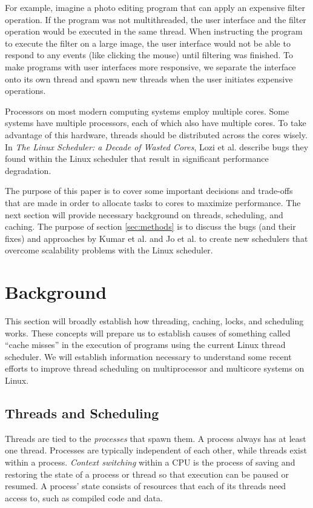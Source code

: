 \documentclass{sig-alternate}
\begin{document}
For example, imagine a photo editing program that can apply an expensive filter operation. If the program was not multithreaded, the user interface and the filter operation would be executed in the same thread. When instructing the program to execute the filter on a large image, the user interface would not be able to respond to any events (like clicking the mouse) until filtering was finished. To make programs with user interfaces more responsive, we separate the interface onto its own thread and spawn new threads when the user initiates expensive operations.

Processors on most modern computing systems employ multiple cores. Some systems have multiple processors, each of which also have multiple cores. To take advantage of this hardware, threads should be distributed across the cores wisely. In \emph{The Linux Scheduler: a Decade of Wasted Cores}, Lozi et al. describe bugs they found within the Linux scheduler that result in significant performance degradation. 

The purpose of this paper is to cover some important decisions and trade-offs that are made in order to allocate tasks to cores to maximize performance. The next section will provide necessary background on threads, scheduling, and caching. The purpose of section \ref{sec:methods} is to discuss the bugs (and their fixes) and approaches by Kumar et al. and Jo et al. to create new schedulers that overcome scalability problems with the Linux scheduler.
\section{Background}
\label{sec:bg}

This section will broadly establish how threading, caching, locks, and scheduling works. These concepts will prepare us to establish causes of something called ``cache misses'' in the execution of programs using the current Linux thread scheduler. We will establish information necessary to understand some recent efforts to improve thread scheduling on multiprocessor and multicore systems on Linux.

\subsection{Threads and Scheduling}
\label{sec:threads}

Threads are tied to the \emph{processes} that spawn them. A process always has at least one thread. Processes are typically independent of each other, while threads exist within a process. \emph{Context switching} within a CPU is the process of saving and restoring the state of a process or thread so that execution can be paused or resumed. A process' state consists of resources that each of its threads need access to, such as compiled code and data.
\end{document}
